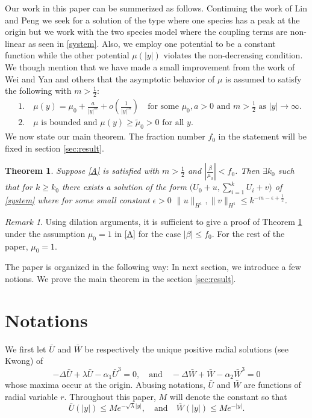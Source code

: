 \documentclass[a4paper,11pt]{article}
\def\red{\color{red}}
\def\red{\color{red}}
\newtheorem{theorem}{Theorem}
\theoremstyle{remark}
\newtheorem{remark}{Remark}[section]
\begin{document}
Our work in this paper can be summerized as follows. Continuing the work of Lin and Peng  \cite{lin_peng_2014} we seek for a solution of the type where one species has a peak at the origin but we work with the two species model where the coupling terms are non-linear as seen in \eqref{system}. Also, we employ one potential to be a constant function while the other potential $\mu(|y|)$ violates the non-decreasing condition. We though mention that we have made a small improvement from the work of Wei and Yan \cite{wei_yan_2014} and others that the asymptotic behavior of $\mu$ is assumed to satisfy the following with $m> \frac{1}{2}$:
\begin{equation}\tag{$A$}\label{A}
 \begin{aligned}
  &1. \quad \mu(y) = \mu_0 + \frac{a}{|y|^m} + o\left(\frac{1}{|y|^m}\right) \quad \text{for some $\mu_0,a>0$ and $m> \frac{1}{2}$ as $|y| \rightarrow \infty$.}\\
  &2. \quad \text{$\mu$ is bounded and $\mu(y)\ge \tilde{\mu}_0 > 0$ for all $y$.}
 \end{aligned}
\end{equation}
We now state our main theorem. The fraction number $f_0$ in the statement will be fixed in section \ref{sec:result}.
\begin{theorem} \label{mainthm} Suppose \eqref{A} is satisfied with $m > \frac{1}{2}$ and $\left|\frac{\beta}{\mu_0}\right| < f_0$. Then $\exists k_0$ such that for $k\ge k_0$ there exists a solution of the form $\Big(U_0 +u, \displaystyle \sum_{i=1}^k U_i + v\Big)$ of \eqref{system} where for some small constant $\epsilon>0$ $ \|u\|_{H^1},  \|v\|_{H^1} \le k^{-m -\epsilon + \frac{1}{2}}$.
\end{theorem}
\begin{remark}
  Using dilation arguments, it is sufficient to give a proof of Theorem \ref{mainthm} under the assumption $\mu_0=1$ in \eqref{A} for the  case $|\beta| \le f_0$. For the rest of the paper, $\mu_0=1$.
\end{remark}
The paper is organized in the following way: In next section, we introduce a few notions. We prove the main theorem in the section \ref{sec:result}.

\section{Notations} \label{notions}

We first let $\bar{U}$ and $\bar{W}$ be respectively the unique positive radial solutions (see {\red Kwong}) of 
\begin{equation*}
 -\Delta \bar{U} + \lambda \bar{U} - \alpha_1 \bar{U}^3 = 0, \quad \text{and} \quad -\Delta \bar{W} + \bar{W} - \alpha_2 \bar{W}^3 = 0
\end{equation*}
whose maxima occur at the origin. Abusing notations, $\bar{U}$ and $\bar{W}$ are functions of radial variable $r$. Throughout this paper, $M$ will denote the constant so that 
$$\bar{U}(|y|) \le Me^{-\sqrt{\lambda}|y|}, \quad \text{and} \quad \bar{W}(|y|) \le Me^{-|y|}.$$
\end{document}
